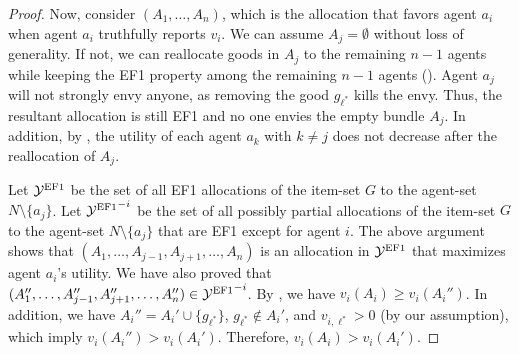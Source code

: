 \begin{proof}
Now, consider $(A_1,\ldots,A_n)$, which is the allocation that favors agent $a_i$ when agent $a_i$ truthfully reports $v_i$.
We can assume $A_j=\emptyset$ without loss of generality.
If not, we can reallocate goods in $A_j$ to the remaining $n-1$ agents while keeping the EF1 property among the remaining $n-1$ agents ().
Agent $a_j$ will not strongly envy anyone, as removing the good $g_{\ell^\ast}$ kills the envy.
Thus, the resultant allocation is still EF1 and no one envies the empty bundle $A_j$.
In addition, by , the utility of each agent $a_k$ with $k\neq j$ does not decrease after the reallocation of $A_j$.

Let ${\mathcal{Y}^{\mathrm{EF1}}}$ be the set of all EF1 allocations of the item-set $G$ to the agent-set $N\setminus\{a_j\}$.
Let ${\mathcal{Y}^{\mathrm{EF1}}}^{-i}$ be the set of all possibly partial allocations of the item-set $G$ to the agent-set $N\setminus\{a_j\}$ that are EF1 except for agent $i$.
The above argument shows that $(A_1,\ldots,A_{j-1},A_{j+1},\ldots,A_n)$ is an allocation in ${\mathcal{Y}^{\mathrm{EF1}}}$ that maximizes agent $a_i$'s utility.
We have also proved that $(A_1'',\ldots,A_{j-1}'',A_{j+1}'',\ldots,A_n'')\in {\mathcal{Y}^{\mathrm{EF1}}}^{-i}$.
By , we have $v_i(A_i)\geq v_i(A_i'')$.
In addition, we have $A_i''=A_i'\cup\{g_{\ell^\ast}\}$, $g_{\ell^\ast}\notin A_i'$, and $v_{i,\ell^\ast}>0$ (by our assumption), which imply $v_i(A_i'')>v_i(A_i')$.
Therefore, $v_i(A_i)>v_i(A_i')$.
\end{proof}
